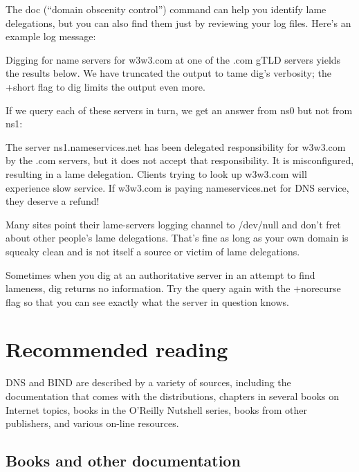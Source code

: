 The
{doc}{\protect\hypertarget{part0024_split_072.htmlux5cux23_idIndexMarker2298}{}{}\protect\hypertarget{part0024_split_072.htmlux5cux23_idIndexMarker2299}{}{}}
(``domain obscenity control'') command can help you identify lame
delegations, but you can also find them just by reviewing your log
files. Here's an example log message:


Digging for name servers for w3w3.com at one of the .com gTLD servers
yields the results below. We have truncated the output to tame {dig}'s
verbosity; the {+short} flag to {dig} limits the output even more.


If we query each of these servers in turn, we get an answer from ns0 but
not from ns1:


The server ns1.nameservices.net has been delegated responsibility for
w3w3.com by the .com servers, but it does not accept that
responsibility. It is misconfigured, resulting in a lame delegation.
Clients trying to look up w3w3.com will experience slow service. If
w3w3.com is paying nameservices.net for DNS service, they deserve a
refund!

Many sites point their {lame-servers} logging channel to {/dev/null} and
don't fret about other people's lame delegations. That's fine as long as
your own domain is squeaky clean and is not itself a source or victim of
lame delegations.

Sometimes when you {dig} at an authoritative server in an attempt to
find lameness, {dig} returns no information. Try the query again with
the {+norecurse} flag so that you can see exactly what the server in
question knows.



\section{Recommended reading}

DNS and BIND are described by a variety of sources, including the
documentation that comes with the distributions, chapters in several
books on Internet topics, books in the O'Reilly Nutshell series, books
from other publishers, and various on-line resources.

\protect\hypertarget{part0024_split_074.html}{}{}

\hypertarget{part0024_split_074.htmlux5cux23_idContainer1069}{}
\hypertarget{part0024_split_074.htmlux5cux23calibre_pb_73}{%
\subsection[Books and other
documentation]{\texorpdfstring{\protect\hypertarget{part0024_split_074.htmlux5cux23_idTextAnchor968}{}{}Books
and other
documentation}{Books and other documentation}}\label{part0024_split_074.htmlux5cux23calibre_pb_73}}

